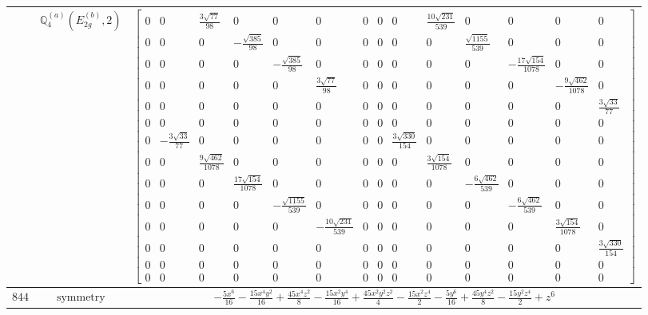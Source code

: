 \documentclass[fleqn,8pt,landscape]{jsarticle}
\begin{document}
\begin{longtable}{ccc}
$  $ & $ \mathbb{Q}_{4}^{(a)}(E_{2g}^{(b)},2) $ & $ \begin{bmatrix} 0 & 0 & \frac{3 \sqrt{77}}{98} & 0 & 0 & 0 & 0 & 0 & 0 & \frac{10 \sqrt{231}}{539} & 0 & 0 & 0 & 0 \\ 0 & 0 & 0 & - \frac{\sqrt{385}}{98} & 0 & 0 & 0 & 0 & 0 & 0 & \frac{\sqrt{1155}}{539} & 0 & 0 & 0 \\ 0 & 0 & 0 & 0 & - \frac{\sqrt{385}}{98} & 0 & 0 & 0 & 0 & 0 & 0 & - \frac{17 \sqrt{154}}{1078} & 0 & 0 \\ 0 & 0 & 0 & 0 & 0 & \frac{3 \sqrt{77}}{98} & 0 & 0 & 0 & 0 & 0 & 0 & - \frac{9 \sqrt{462}}{1078} & 0 \\ 0 & 0 & 0 & 0 & 0 & 0 & 0 & 0 & 0 & 0 & 0 & 0 & 0 & \frac{3 \sqrt{33}}{77} \\ 0 & 0 & 0 & 0 & 0 & 0 & 0 & 0 & 0 & 0 & 0 & 0 & 0 & 0 \\ 0 & - \frac{3 \sqrt{33}}{77} & 0 & 0 & 0 & 0 & 0 & 0 & \frac{3 \sqrt{330}}{154} & 0 & 0 & 0 & 0 & 0 \\ 0 & 0 & \frac{9 \sqrt{462}}{1078} & 0 & 0 & 0 & 0 & 0 & 0 & \frac{3 \sqrt{154}}{1078} & 0 & 0 & 0 & 0 \\ 0 & 0 & 0 & \frac{17 \sqrt{154}}{1078} & 0 & 0 & 0 & 0 & 0 & 0 & - \frac{6 \sqrt{462}}{539} & 0 & 0 & 0 \\ 0 & 0 & 0 & 0 & - \frac{\sqrt{1155}}{539} & 0 & 0 & 0 & 0 & 0 & 0 & - \frac{6 \sqrt{462}}{539} & 0 & 0 \\ 0 & 0 & 0 & 0 & 0 & - \frac{10 \sqrt{231}}{539} & 0 & 0 & 0 & 0 & 0 & 0 & \frac{3 \sqrt{154}}{1078} & 0 \\ 0 & 0 & 0 & 0 & 0 & 0 & 0 & 0 & 0 & 0 & 0 & 0 & 0 & \frac{3 \sqrt{330}}{154} \\ 0 & 0 & 0 & 0 & 0 & 0 & 0 & 0 & 0 & 0 & 0 & 0 & 0 & 0 \\ 0 & 0 & 0 & 0 & 0 & 0 & 0 & 0 & 0 & 0 & 0 & 0 & 0 & 0 \end{bmatrix} $ \\ \hline
$ 844 $ & $ \text{symmetry} $ & $ - \frac{5 x^{6}}{16} - \frac{15 x^{4} y^{2}}{16} + \frac{45 x^{4} z^{2}}{8} - \frac{15 x^{2} y^{4}}{16} + \frac{45 x^{2} y^{2} z^{2}}{4} - \frac{15 x^{2} z^{4}}{2} - \frac{5 y^{6}}{16} + \frac{45 y^{4} z^{2}}{8} - \frac{15 y^{2} z^{4}}{2} + z^{6} $ \\

\end{longtable}
\end{document}
